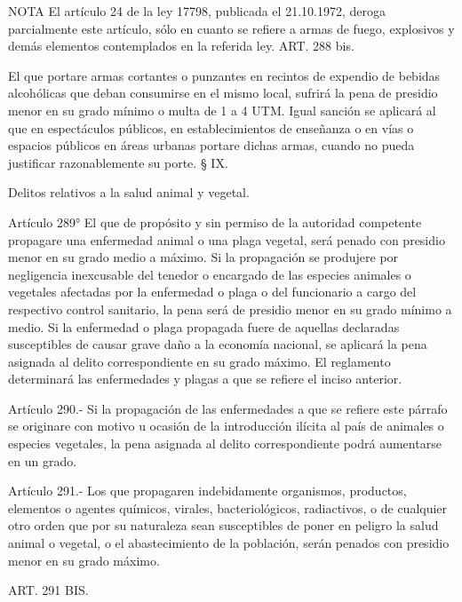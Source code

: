 NOTA
      El artículo 24 de la ley 17798, publicada el 21.10.1972, deroga parcialmente este artículo, sólo en cuanto se refiere a armas de fuego, explosivos y demás elementos contemplados en la referida ley.
    ART. 288 bis.

    El que portare armas cortantes o punzantes en recintos de expendio de bebidas alcohólicas que deban consumirse en el mismo local, sufrirá la pena de presidio menor en su grado mínimo o multa de 1 a 4 UTM.
    Igual sanción se aplicará al que en espectáculos públicos, en establecimientos de enseñanza o en vías o espacios públicos en áreas urbanas portare dichas armas, cuando no pueda justificar razonablemente su porte.
    § IX.

    Delitos relativos a la salud animal y vegetal.


    Artículo 289° El que de propósito y sin permiso de la autoridad competente propagare una enfermedad animal o una plaga vegetal, será penado con presidio menor en su grado medio a máximo.
    Si la propagación se produjere por negligencia inexcusable del tenedor o encargado de las especies animales o vegetales afectadas por la enfermedad o plaga o del funcionario a cargo del respectivo control sanitario, la pena será de presidio menor en su grado mínimo a medio.
    Si la enfermedad o plaga propagada fuere de aquellas declaradas susceptibles de causar grave daño a la economía nacional, se aplicará la pena asignada al delito correspondiente en su grado máximo.
    El reglamento determinará las enfermedades y plagas a que se refiere el inciso anterior.




    Artículo 290.- Si la propagación de las enfermedades a que se refiere este párrafo se originare con motivo u ocasión de la introducción ilícita al país de animales o especies vegetales, la pena asignada al delito correspondiente podrá aumentarse en un grado.





    Artículo 291.- Los que propagaren indebidamente organismos, productos, elementos o agentes químicos, virales, bacteriológicos, radiactivos, o de cualquier otro orden que por su naturaleza sean susceptibles de poner en peligro la salud animal o vegetal, o el abastecimiento de la población, serán penados con presidio menor en su grado máximo.


    ART. 291 BIS.


